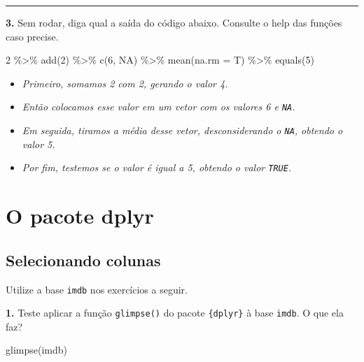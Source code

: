 \documentclass[
]{book}
\newenvironment{Shaded}{\begin{snugshade}}{\end{snugshade}}
\newcommand{\AttributeTok}[1]{\textcolor[rgb]{0.77,0.63,0.00}{#1}}
\newcommand{\ConstantTok}[1]{\textcolor[rgb]{0.00,0.00,0.00}{#1}}
\newcommand{\DecValTok}[1]{\textcolor[rgb]{0.00,0.00,0.81}{#1}}
\newcommand{\FunctionTok}[1]{\textcolor[rgb]{0.00,0.00,0.00}{#1}}
\newcommand{\NormalTok}[1]{#1}
\newcommand{\SpecialCharTok}[1]{\textcolor[rgb]{0.00,0.00,0.00}{#1}}
\providecommand{\tightlist}{%
  \setlength{\itemsep}{0pt}\setlength{\parskip}{0pt}}
\begin{document}
\begin{center}\rule{0.5\linewidth}{0.5pt}\end{center}

\textbf{3.} Sem rodar, diga qual a saída do código abaixo. Consulte o help das funções caso precise.

\begin{Shaded}
\begin{Highlighting}[]
\DecValTok{2} \SpecialCharTok{\%\textgreater{}\%}
  \FunctionTok{add}\NormalTok{(}\DecValTok{2}\NormalTok{) }\SpecialCharTok{\%\textgreater{}\%}
  \FunctionTok{c}\NormalTok{(}\DecValTok{6}\NormalTok{, }\ConstantTok{NA}\NormalTok{) }\SpecialCharTok{\%\textgreater{}\%}
  \FunctionTok{mean}\NormalTok{(}\AttributeTok{na.rm =}\NormalTok{ T) }\SpecialCharTok{\%\textgreater{}\%}
  \FunctionTok{equals}\NormalTok{(}\DecValTok{5}\NormalTok{)}
\end{Highlighting}
\end{Shaded}

\begin{itemize}
\tightlist
\item
  \emph{Primeiro, somamos 2 com 2, gerando o valor 4.}
\item
  \emph{Então colocamos esse valor em um vetor com os valores 6 e \texttt{NA}.}
\item
  \emph{Em seguida, tiramos a média desse vetor, desconsiderando o \texttt{NA}, obtendo o valor 5.}
\item
  \emph{Por fim, testemos se o valor é igual a 5, obtendo o valor \texttt{TRUE}.}
\end{itemize}

\hypertarget{o-pacote-dplyr}{%
\section{O pacote dplyr}\label{o-pacote-dplyr}}

\hypertarget{selecionando-colunas-1}{%
\subsection*{Selecionando colunas}\label{selecionando-colunas-1}}

Utilize a base \texttt{imdb} nos exercícios a seguir.

\textbf{1.} Teste aplicar a função \texttt{glimpse()} do pacote \texttt{\{dplyr\}} à base \texttt{imdb}. O que ela faz?

\begin{Shaded}
\begin{Highlighting}[]
\FunctionTok{glimpse}\NormalTok{(imdb)}
\end{Highlighting}
\end{Shaded}
\end{document}
